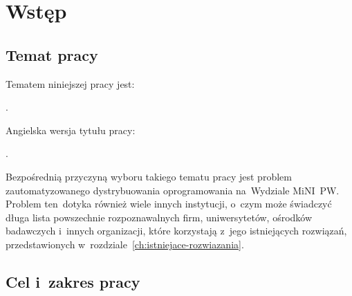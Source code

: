 \documentclass[thesis]{subfiles}
\makeatletter
\let\inserttitle\@title
\let\inserttitleaux\@titleaux
\makeatother
\begin{document}
\chapter{Wstęp}


\section{Temat pracy}

\noindent Tematem niniejszej pracy jest:\mynobreakpar
\begin{displayquote}
\inserttitle.
\end{displayquote}
Angielska wersja tytułu pracy:\mynobreakpar
\begin{displayquote}
\inserttitleaux.
\end{displayquote}
Bezpośrednią przyczyną wyboru takiego tematu pracy jest problem zautomatyzowanego dystrybuowania oprogramowania na~Wydziale MiNI~PW. Problem ten~dotyka również wiele innych instytucji, o~czym może świadczyć długa lista powszechnie rozpoznawalnych firm, uniwersytetów, ośrodków badawczych i~innych organizacji, które korzystają z~jego istniejących rozwiązań, przedstawionych w~rozdziale~\ref{ch:istniejace-rozwiazania}.%


\section{Cel i~zakres pracy}
\label{sec:cel-i-zakres}
\end{document}
